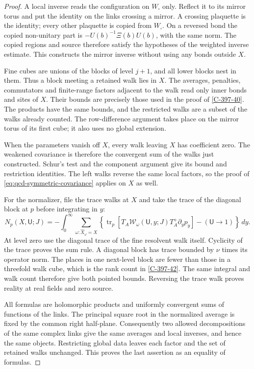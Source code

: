 \documentclass[11pt,letterpaper,reqno]{amsart}
\theoremstyle{definition}
\theoremstyle{remark}
\begin{document}
\begin{proof}
A local inverse reads the configuration on $W_\square$ only.
Reflect it to its mirror torus and put the identity on the
links crossing a mirror.  A crossing plaquette is the identity;
every other plaquette is copied from $W_\square$.  On a reversed
bond the copied non-unitary part is
$-U(b)^{-1}\Xi(b)U(b)$, with the same norm.  The copied regions
and source therefore satisfy the hypotheses of the weighted
inverse estimate.  This constructs the mirror inverse without
using any bonds outside $X$.

Fine cubes are unions of the blocks of level $j+1$, and all
lower blocks nest in them.  Thus a block meeting a retained
walk lies in $X$.  The averages, penalties, commutators and
finite-range factors adjacent to the walk read only inner
bonds and sites of $X$.  Their bounds are precisely those used
in the proof of \cref{C-397-40}.  The products have the same
bounds, and the restricted walks are a subset of the walks
already counted.  The row-difference argument takes place
on the mirror torus of its first cube; it also uses no global
extension.

When the parameters vanish off $X$, every walk leaving $X$
has coefficient zero.  The weakened covariance is therefore
the convergent sum of the walks just constructed.  Schur's
test and the component argument give its bound and restriction
identities.  The left walks reverse the same local factors,
so the proof of \eqref{eq:qcd-symmetric-covariance} applies
on $X$ as well.

For the normalizer, file the trace walks at $X$ and take the
trace of the diagonal block at $p$ before integrating in $y$:
\[
 N_p(X,\mathsf U;J)=-\int_0^\infty\sum_{\omega:\widehat X_\omega=X}
 \left\{\operatorname{tr}_p
 [T_A\mathcal W_\omega(\mathsf U,y;J)T_A^+\partial_yp_y]
                   -(\mathsf U\to1)\right\}\,dy.
\]
At level zero use the diagonal trace of the fine resolvent
walk itself.  Cyclicity of the trace proves the sum rule.
A diagonal block has trace bounded by $\nu$ times its operator
norm.  The places in one next-level block are fewer than
those in a threefold walk cube, which is the rank count in
\cref{C-397-42}.  The same integral and walk count therefore
give both pointed bounds.  Reversing the trace walk proves
reality at real fields and zero source.

All formulas are holomorphic products and uniformly convergent
sums of functions of the links.  The principal square root
in the normalized average is fixed by the common right
half-plane.  Consequently two allowed decompositions of the
same complex links give the same averages and local inverses,
and hence the same objects.  Restricting global data leaves
each factor and the set of retained walks unchanged.  This
proves the last assertion as an equality of formulas.
\end{proof}
\end{document}
